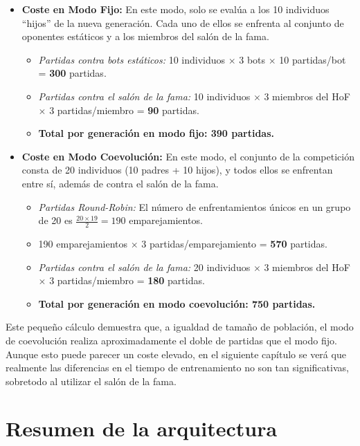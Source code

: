 \begin{itemize}
    \item \textbf{Coste en Modo Fijo:} En este modo, solo se evalúa a los 10 individuos ``hijos'' de la nueva generación. Cada uno de ellos se enfrenta al conjunto de oponentes estáticos y a los miembros del salón de la fama.
    \begin{itemize}
        \item \textit{Partidas contra bots estáticos:} 10 individuos $\times$ 3 bots $\times$ 10 partidas/bot = \textbf{300} partidas.
        \item \textit{Partidas contra el salón de la fama:} 10 individuos $\times$ 3 miembros del HoF $\times$ 3 partidas/miembro = \textbf{90} partidas.
        \item \textbf{Total por generación en modo fijo: 390 partidas.}
    \end{itemize}
    \vspace{0.5cm}
    
    \item \textbf{Coste en Modo Coevolución:} En este modo, el conjunto de la competición consta de 20 individuos (10 padres + 10 hijos), y todos ellos se enfrentan entre sí, además de contra el salón de la fama.
    \begin{itemize}
        \item \textit{Partidas Round-Robin:} El número de enfrentamientos únicos en un grupo de 20 es $\frac{20 \times 19}{2} = 190$ emparejamientos.
        \item 190 emparejamientos $\times$ 3 partidas/emparejamiento = \textbf{570} partidas.
        \item \textit{Partidas contra el salón de la fama:} 20 individuos $\times$ 3 miembros del HoF $\times$ 3 partidas/miembro = \textbf{180} partidas.
        \item \textbf{Total por generación en modo coevolución: 750 partidas.}
    \end{itemize}
\end{itemize}

Este pequeño cálculo demuestra que, a igualdad de tamaño de población, el modo de coevolución realiza aproximadamente el doble de partidas que el modo fijo. Aunque esto puede parecer un coste elevado, en el siguiente capítulo se verá que realmente las diferencias en el tiempo de entrenamiento no son tan significativas, sobretodo al utilizar el salón de la fama.

\section{Resumen de la arquitectura} \label{sec:resumen_architectura}

